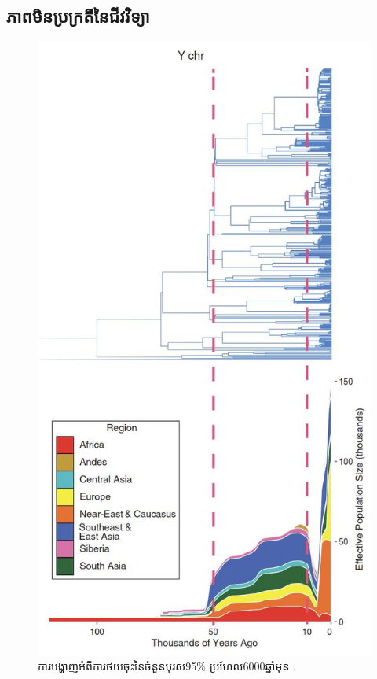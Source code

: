 \documentclass[10pt,twocolumn,letterpaper]{article}
\begin{document}
\subsection{ភាពមិនប្រក្រតីនៃជីវវិទ្យា}

\begin{figure}[b]
\begin{center}
   \includegraphics[width=1\linewidth]{bottleneck.jpg}
\end{center}
   \caption{ការបង្ហាញអំពីការថយចុះនៃចំនួនបុរស95\% ប្រហែល6000ឆ្នាំមុន \cite{62}.}
\label{fig:10}
\label{fig:onecol}
\end{figure}
\end{document}
